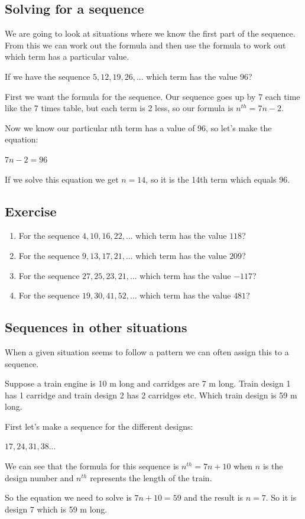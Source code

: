 \subsection{Solving for a sequence}
We are going to look at situations where we know the first part of the sequence.  From this we can work out the formula and then use the formula to work out which term has a particular value.

\begin{exmp}
If we have the sequence $5, 12, 19, 26, ...$ which term has the value 96?

First we want the formula for the sequence.  Our sequence goes up by 7 each time like the 7 times table, but each term is 2 less, so our formula is $n^{th}=7n-2$.

Now we know our particular nth term has a value of 96, so let's make the equation:

$7n-2=96$

If we solve this equation we get $n=14$, so it is the 14th term which equals 96.
\end{exmp}

\subsection{Exercise}
\begin{enumerate}
	\item For the sequence $4,10,16,22,...$ which term has the value $118$?
	\item For the sequence $9,13,17,21,...$ which term has the value $209$?
	\item For the sequence $27, 25, 23, 21, ...$ which term has the value $-117$?
	\item For the sequence $19,30,41,52,...$ which term has the value $481$?
\end{enumerate}

\subsection{Sequences in other situations}
When a given situation seems to follow a pattern we can often assign this to a sequence.

\begin{exmp}
Suppose a train engine is 10 m long and carridges are 7 m long. Train design 1 has 1 carridge and train design 2 has 2 carridges etc. Which train design is 59 m long.

First let's make a sequence for the different designs:

\bigskip

$17, 24, 31, 38...$

\bigskip

We can see that the formula for this sequence is $n^{th}=7n+10$ when $n$ is the design number and $n^{th}$ represents the length of the train.

\bigskip

So the equation we need to solve is $7n+10=59$ and the result is $n=7$.  So it is design 7 which is 59 m long.
\end{exmp}
